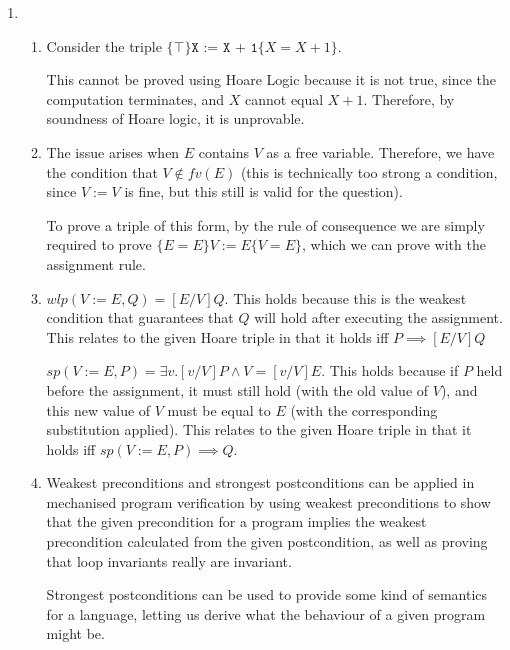 


\begin{enumerate}[label=(\alph*)]

  \item
    \begin{enumerate}[label=(\roman*)]

      \item

        Consider the triple $\{\top\}\texttt{X := X + 1}\{X = X+1\}$.

        This cannot  be proved using Hoare Logic because it is not true, since the computation terminates, and $X$ cannot equal $X+1$. Therefore, by soundness of Hoare logic, it is unprovable.

        \item
          The issue arises when $E$ contains $V$ as a free variable. Therefore, we have the condition that $V \not \in fv(E)$ (this is technically too strong a condition, since $V := V$ is fine, but this still is valid for the question).

          To prove a triple of this form, by the rule of consequence we are simply required to prove $\{E = E\}V := E\{V = E\}$, which we can prove with the assignment rule.

          \item
            $wlp(V:= E, Q) = [E / V]Q$. This holds because this is the weakest condition that guarantees that $Q$ will hold after executing the assignment. This relates to the given Hoare triple in that it holds iff $P \implies [E / V]Q$

            $sp(V:= E, P) = \exists v. [v / V]P \wedge V = [v / V]E$. This holds because if $P$ held before the assignment, it must still hold (with the old value of $V$), and this new value of $V$ must be equal to $E$ (with the corresponding substitution applied). This relates to the given Hoare triple in that it holds iff $sp(V:= E, P) \implies Q$.
            \item
              Weakest preconditions and strongest postconditions can be applied in mechanised program verification by using weakest preconditions to show that the given precondition for a program implies the weakest precondition calculated from the given postcondition, as well as proving that loop invariants really are invariant.

              Strongest postconditions can be used to provide some kind of semantics for a language, letting us derive what the behaviour of a given program might be.


\end{enumerate}
\end{enumerate}
